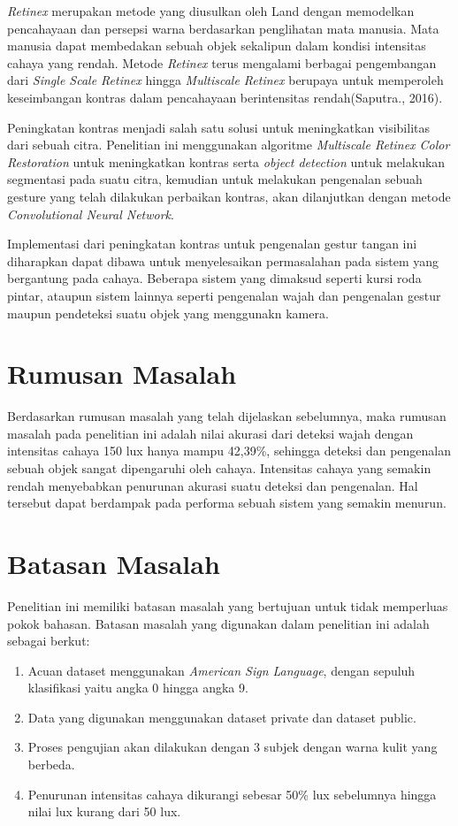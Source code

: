 \emph{Retinex} merupakan metode yang diusulkan oleh Land dengan memodelkan pencahayaan dan persepsi warna berdasarkan penglihatan mata manusia. Mata manusia dapat membedakan sebuah objek sekalipun dalam kondisi intensitas cahaya yang rendah. Metode \emph{Retinex} terus mengalami berbagai pengembangan dari \emph{Single Scale Retinex} hingga \emph{Multiscale Retinex} berupaya untuk memperoleh keseimbangan kontras dalam pencahayaan berintensitas rendah(Saputra., 2016).

Peningkatan kontras menjadi salah satu solusi untuk meningkatkan visibilitas dari sebuah citra. Penelitian ini menggunakan algoritme \emph{Multiscale Retinex Color Restoration} untuk meningkatkan kontras serta \emph{object detection} untuk melakukan segmentasi pada suatu citra, kemudian untuk melakukan pengenalan sebuah gesture yang telah dilakukan perbaikan kontras, akan dilanjutkan dengan metode \emph{Convolutional Neural Network}. 

Implementasi dari peningkatan kontras untuk pengenalan gestur tangan ini diharapkan dapat dibawa untuk menyelesaikan permasalahan pada sistem yang bergantung pada cahaya. Beberapa sistem yang dimaksud seperti kursi roda pintar, ataupun sistem lainnya seperti pengenalan wajah dan pengenalan gestur maupun pendeteksi suatu objek yang menggunakn kamera. 
\section{Rumusan Masalah}
Berdasarkan rumusan masalah yang telah dijelaskan sebelumnya, maka rumusan masalah pada penelitian ini adalah nilai akurasi dari deteksi wajah dengan intensitas cahaya 150 lux hanya mampu 42,39\%, sehingga deteksi dan pengenalan sebuah objek sangat dipengaruhi oleh cahaya. Intensitas cahaya yang semakin rendah menyebabkan penurunan akurasi suatu deteksi dan pengenalan. Hal tersebut dapat berdampak pada performa sebuah sistem yang semakin menurun. 
\section{Batasan Masalah}
Penelitian ini memiliki batasan masalah yang bertujuan untuk tidak memperluas pokok bahasan. Batasan masalah yang digunakan dalam penelitian ini adalah sebagai berkut:
\begin{enumerate}
\item Acuan dataset menggunakan \emph{American Sign Language}, dengan sepuluh klasifikasi yaitu angka 0 hingga angka 9.
\item Data yang digunakan menggunakan dataset private dan dataset public.
\item Proses pengujian akan dilakukan dengan 3 subjek dengan warna kulit yang berbeda.
\item Penurunan intensitas cahaya dikurangi sebesar 50\% lux sebelumnya hingga nilai lux kurang dari 50 lux.
\end{enumerate}
